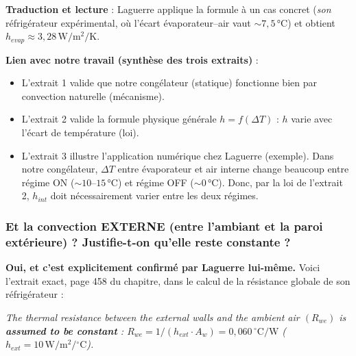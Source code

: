 \documentclass[11pt,a4paper]{article}
\begin{document}
\textbf{Traduction et lecture} : Laguerre applique la formule à un cas concret
(\emph{son} réfrigérateur expérimental, où l'écart évaporateur--air vaut
$\sim 7{,}5\,\si{\celsius}$) et obtient $h_{evap} \approx 3{,}28\,\si{\watt\per\meter\squared\per\kelvin}$.

\medskip
\textbf{Lien avec notre travail (synthèse des trois extraits)} :
\begin{itemize}[itemsep=2pt]
\item L'extrait 1 valide que notre congélateur (statique) fonctionne bien par convection
naturelle (mécanisme).
\item L'extrait 2 valide la formule physique générale $h = f(\Delta T)$ : $h$ varie avec
l'écart de température (loi).
\item L'extrait 3 illustre l'application numérique chez Laguerre (exemple). Dans notre
congélateur, $\Delta T$ entre évaporateur et air interne change beaucoup entre régime ON
($\sim 10$--$15\,\si{\celsius}$) et régime OFF ($\sim 0\,\si{\celsius}$). Donc, par la loi
de l'extrait 2, $h_{int}$ doit nécessairement varier entre les deux régimes.
\end{itemize}

\subsubsection*{Et la convection EXTERNE (entre l'ambiant et la paroi extérieure) ?
Justifie-t-on qu'elle reste constante ?}

\textbf{Oui, et c'est explicitement confirmé par Laguerre lui-même.} Voici l'extrait
exact, page 458 du chapitre, dans le calcul de la résistance globale de son réfrigérateur :

\begin{tcolorbox}[breakable,enhanced jigsaw,colback=yellow!10,colframe=yellow!50!black,boxrule=0.4pt,arc=2pt]
\og{} \emph{The thermal resistance between the external walls and the ambient air
$(R_{we})$ is \textbf{assumed to be constant} : $R_{we} = 1/(h_{ext} \cdot A_w) =
0{,}060\,{}^\circ \mathrm{C/W}$ ($h_{ext} = 10\,\mathrm{W/m^2/{}^\circ C}$).} \fg{}
\end{tcolorbox}
\end{document}
